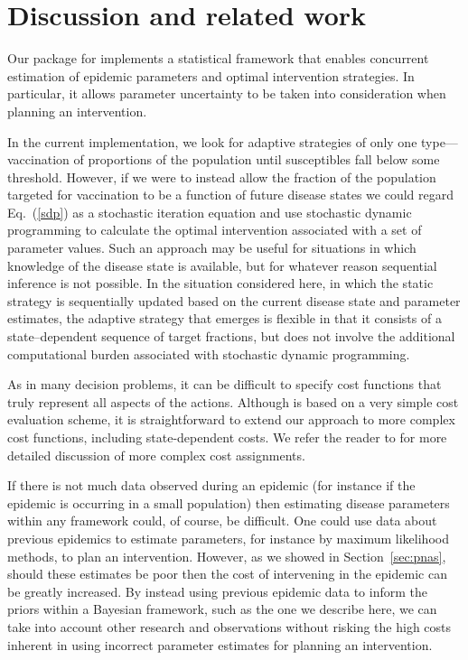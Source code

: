 \documentclass[shortnames,nojss]{jss}
\begin{document}
\section{Discussion and related work}
\label{sec:discuss}


Our  package for  implements a statistical framework
that enables concurrent estimation of epidemic parameters and optimal
intervention strategies. In particular, it allows parameter
uncertainty to be taken into consideration when planning an
intervention.

In the current implementation, we look for adaptive strategies of only
one type---vaccination of proportions of the population until
susceptibles fall below some threshold. However, if we were to instead
allow the fraction of the population targeted for vaccination to be a
function of future disease states we could regard Eq.~(\ref{sdp}) as a
stochastic iteration equation and use stochastic dynamic programming
\citep{clark00} to calculate the optimal intervention associated with a
set of parameter values. Such an approach may be useful for situations
in which knowledge of the disease state is available, but for whatever
reason sequential inference is not possible.  In the situation
considered here, in which the static strategy is sequentially updated
based on the current disease state and parameter estimates, the
adaptive strategy that emerges is flexible in that it consists of a
state--dependent sequence of target fractions, but does not involve the
additional computational burden associated with stochastic dynamic
programming.

As in many decision problems, it can be difficult to specify cost
functions that truly represent all aspects of the actions.  Although
 is based on a very simple cost evaluation scheme, it is
straightforward to extend our approach to more complex cost functions,
including state-dependent costs.  We refer the reader to \cite{merl09} for
more detailed discussion of more complex cost assignments.  

If there is not much data observed during an epidemic (for instance if
the epidemic is occurring in a small population) then estimating
disease parameters within any framework could, of course, be
difficult. One could use data about previous epidemics to estimate
parameters, for instance by maximum likelihood methods, to plan an
intervention. However, as we showed in Section~\ref{sec:pnas}, should
these estimates be poor then the cost of intervening in the epidemic can
be greatly increased. By instead using previous epidemic data to
inform the priors within a Bayesian framework, such as the one we
describe here, we can take into account other research and
observations without risking the high costs inherent in using
incorrect parameter estimates for planning an intervention.
\end{document}
